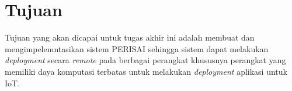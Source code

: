 \section{Tujuan}

Tujuan yang akan dicapai untuk tugas akhir ini adalah membuat dan mengimpelemntasikan sistem PERISAI sehingga sistem dapat melakukan \textit{deployment} secara \textit{remote} pada berbagai perangkat khususnya perangkat yang memiliki daya komputasi terbatas untuk melakukan \textit{deployment} aplikasi untuk IoT.